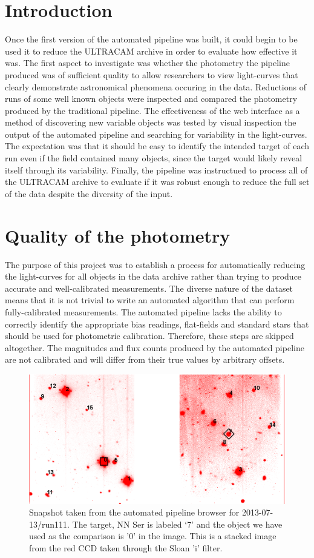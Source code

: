 \section{Introduction}
Once the first version of the automated pipeline was built, it could begin to be used it to reduce the ULTRACAM archive in order to evaluate how effective it was. The first aspect to investigate was whether the photometry the pipeline produced was of sufficient quality to allow researchers to view light-curves that clearly demonstrate astronomical phenomena occuring in the data. Reductions of runs of some well known objects were inspected and compared the photometry produced by the traditional pipeline. The effectiveness of the web interface as a method of discovering new variable objects was tested by visual inspection the output of the automated pipeline and searching for variability in the light-curves. The expectation was that it should be easy to identify the intended target of each run even if the field contained many objects, since the target would likely reveal itself through its variability. Finally, the pipeline was instructued to process all of the ULTRACAM archive to evaluate if it was robust enough to reduce the full set of the data despite the diversity of the input. 

\section{Quality of the photometry}
The purpose of this project was to establish a process for automatically reducing the light-curves for all objects in the data archive rather than trying to produce accurate and well-calibrated measurements. The diverse nature of the dataset means that it is not trivial to write an automated algorithm that can perform fully-calibrated measurements. The automated pipeline lacks the ability to correctly identify the appropriate bias readings, flat-fields and standard stars that should be used for photometric calibration. Therefore, these steps are skipped altogether. The magnitudes and flux counts produced by the automated pipeline are not calibrated and will differ from their true values by arbitrary offsets. 

\begin{figure}
\centering
\includegraphics[width=120mm]{images/2013-07-13-run111-r-withlabels.png}
\caption{Snapshot taken from the automated pipeline browser for 2013-07-13/run111. The target, {NN Ser} is labeled `7' and the object we have used as the comparison is  '0' in the image. This is a stacked image from the red CCD taken through the Sloan 'i' filter. }
\label{fig:nnserfield}
\end{figure}

